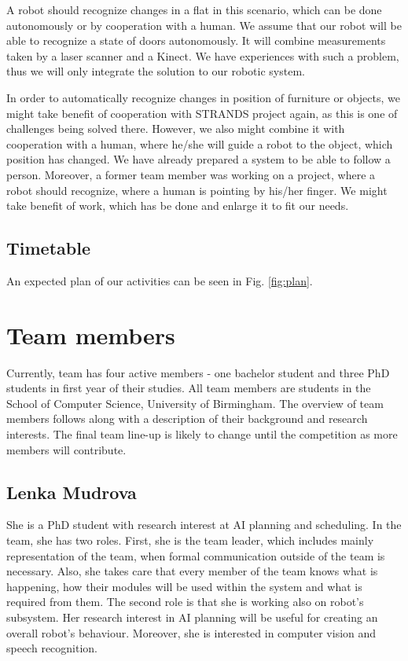 \documentclass[conference]{IEEEtran}
\begin{document}
A robot should recognize changes in a flat in this scenario, which can be done autonomously or by cooperation with a human. We assume that our robot will be able to recognize a state of doors autonomously. It will combine measurements taken by a laser scanner and a Kinect. We have experiences with such a problem, thus we will only integrate the solution to our robotic system. 

In order to automatically recognize changes in position of furniture or objects, we might take benefit of cooperation with STRANDS project again, as this is one of challenges being solved there. However, we also might combine it with cooperation with a human, where he/she will guide a robot to the object, which position has changed. We have already prepared a system to be able to follow a person. Moreover, a former team member was working on a project, where a robot should recognize, where a human is pointing by his/her finger. We might take benefit of work, which has be done and enlarge it to fit our needs. 

\subsection{Timetable}
An expected plan of our activities can be seen in Fig. \ref{fig:plan}.


\section{Team members}

Currently, team has four active members - one bachelor student and three PhD students in first year of their studies. All team members are students in the School of Computer Science, University of Birmingham. The overview of team members follows along with a description of their background and research interests. The final team line-up is likely to change until the competition as more members will contribute.

\subsection{Lenka Mudrova}

She is a PhD student with research interest at AI planning and scheduling. In the team, she has two roles. First, she is the team leader, which includes mainly representation of the team, when formal communication outside of the team is necessary. Also, she takes care that every member of the team knows what is happening, how their modules will be used within the system and what is required from them. The second role is that she is working also on robot's subsystem. Her research interest in AI planning will be useful for creating an overall robot's behaviour. Moreover, she is interested in computer vision and speech recognition. 
\end{document}
